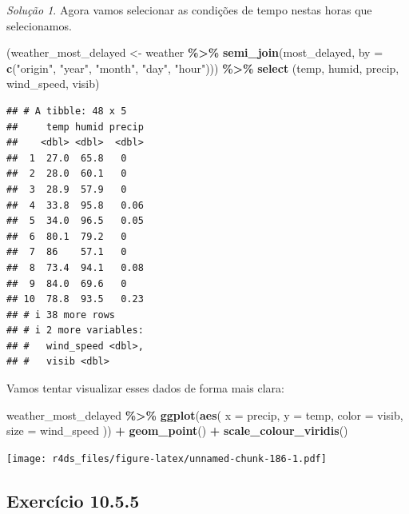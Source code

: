 \documentclass[
]{latex/krantz}
\newenvironment{Shaded}{\begin{snugshade}}{\end{snugshade}}
\newcommand{\AttributeTok}[1]{\textcolor[rgb]{0.13,0.29,0.53}{#1}}
\newcommand{\FunctionTok}[1]{\textcolor[rgb]{0.13,0.29,0.53}{\textbf{#1}}}
\newcommand{\NormalTok}[1]{#1}
\newcommand{\OtherTok}[1]{\textcolor[rgb]{0.56,0.35,0.01}{#1}}
\newcommand{\SpecialCharTok}[1]{\textcolor[rgb]{0.81,0.36,0.00}{\textbf{#1}}}
\newcommand{\StringTok}[1]{\textcolor[rgb]{0.31,0.60,0.02}{#1}}
\theoremstyle{definition}
\theoremstyle{definition}
\theoremstyle{definition}
\theoremstyle{definition}
\theoremstyle{remark}
\newtheorem*{solution}{Solução}
\begin{document}
\begin{solution}
Agora vamos selecionar as condições de tempo nestas horas que selecionamos.

\begin{Shaded}
\begin{Highlighting}[]
\NormalTok{(weather\_most\_delayed }\OtherTok{\textless{}{-}}\NormalTok{ weather }\SpecialCharTok{\%\textgreater{}\%}
  \FunctionTok{semi\_join}\NormalTok{(most\_delayed, }\AttributeTok{by =} \FunctionTok{c}\NormalTok{(}\StringTok{"origin"}\NormalTok{, }\StringTok{"year"}\NormalTok{, }\StringTok{"month"}\NormalTok{, }\StringTok{"day"}\NormalTok{, }\StringTok{"hour"}\NormalTok{))) }\SpecialCharTok{\%\textgreater{}\%}
  \FunctionTok{select}\NormalTok{ (temp, humid, precip, wind\_speed, visib)}
\end{Highlighting}
\end{Shaded}

\begin{verbatim}
## # A tibble: 48 x 5
##     temp humid precip
##    <dbl> <dbl>  <dbl>
##  1  27.0  65.8   0   
##  2  28.0  60.1   0   
##  3  28.9  57.9   0   
##  4  33.8  95.8   0.06
##  5  34.0  96.5   0.05
##  6  80.1  79.2   0   
##  7  86    57.1   0   
##  8  73.4  94.1   0.08
##  9  84.0  69.6   0   
## 10  78.8  93.5   0.23
## # i 38 more rows
## # i 2 more variables:
## #   wind_speed <dbl>,
## #   visib <dbl>
\end{verbatim}

Vamos tentar visualizar esses dados de forma mais clara:

\begin{Shaded}
\begin{Highlighting}[]
\NormalTok{weather\_most\_delayed }\SpecialCharTok{\%\textgreater{}\%}
  \FunctionTok{ggplot}\NormalTok{(}\FunctionTok{aes}\NormalTok{(}
    \AttributeTok{x =}\NormalTok{ precip,}
    \AttributeTok{y =}\NormalTok{ temp,}
    \AttributeTok{color =}\NormalTok{ visib,}
    \AttributeTok{size =}\NormalTok{ wind\_speed}
\NormalTok{  )) }\SpecialCharTok{+}
    \FunctionTok{geom\_point}\NormalTok{() }\SpecialCharTok{+}
    \FunctionTok{scale\_colour\_viridis}\NormalTok{()}
\end{Highlighting}
\end{Shaded}

\texttt{[image: r4ds\_files/figure-latex/unnamed-chunk-186-1.pdf]}
\end{solution}

\hypertarget{exr10-5-5}{%
\subsection*{Exercício 10.5.5}\label{exr10-5-5}}
\end{document}
